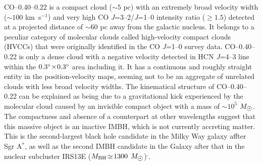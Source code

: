 \documentclass{nature}
\def\kms{\hbox{km s$^{-1}$}}
\def\sun{\hbox{$\odot$}}
\def\arcdeg{\hbox{$^\circ$}}
\begin{document}
CO--0.40--0.22 is a compact cloud ($\sim\!5$ pc) with an extremely broad velocity width ($\sim\!100$ \kms) and very high CO {\it J}=3--2/{\it J}=1--0 intensity ratio ($\geq \!1.5$) detected at a projected distance of $\sim\!60$ pc away from the galactic nucleus\cite{Oka12}. It belongs to a peculiar category of molecular clouds called high-velocity compact clouds (HVCCs) that were originally identified in the CO {\it J}=1--0 survey data\cite{Oka98, Oka99, Oka01}. 
CO--0.40--0.22 is only a dense cloud with a negative velocity detected in HCN {\it J}=4--3 line within the $0.3\arcdeg\!\times\! 0.3\arcdeg$ area including it\cite{Oka16}. It has a continuous and roughly straight entity in the position-velocity maps, seeming not to be an aggregate of unrelated clouds with less broad velocity widths.  
The kinematical structure of CO--0.40--0.22 can be explained as being due to a gravitational kick experienced by the molecular cloud caused by an invisible compact object with a mass of $\sim\!10^5$ $M_{\sun}$. The compactness and absence of a counterpart at other wavelengths suggest that this massive object is an inactive IMBH, which is not currently accreting matter. This is the second-largest black hole candidate in the Milky Way galaxy affter Sgr A$^*$, as well as the second IMBH candidate in the Galaxy after that in the nuclear subcluster IRS13E ($M_{\rm BH}\!\simeq\!1300$ $M_{\sun}$)\cite{Maillard04}$^{,}$\cite{Schoedel05}.
\end{document}
